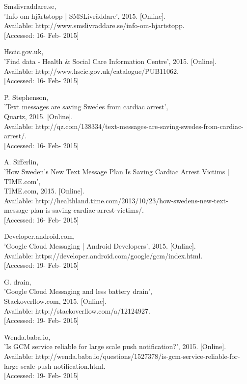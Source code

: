 \documentclass[]{article}
\begin{document}
\begin{enumerate}[label={[\arabic*]}]
\item Smslivraddare.se, \\'Info om hjärtstopp | SMSLivräddare', 2015. [Online].\\ Available: http://www.smslivraddare.se/info-om-hjartstopp. \\{} [Accessed: 16- Feb- 2015]

\item Hscic.gov.uk, \\'Find data - Health \& Social Care Information Centre', 2015. [Online].\\ Available: http://www.hscic.gov.uk/catalogue/PUB11062. \\{} [Accessed: 16- Feb- 2015]

\item P. Stephenson, \\'Text messages are saving Swedes from cardiac arrest', \\Quartz, 2015. [Online]. \\Available: http://qz.com/138334/text-messages-are-saving-swedes-from-cardiac-arrest/. \\{}[Accessed: 16- Feb- 2015]

\item A. Sifferlin,\\ 'How Sweden’s New Text Message Plan Is Saving Cardiac Arrest Victims | TIME.com', \\TIME.com, 2015. [Online].\\ Available: http://healthland.time.com/2013/10/23/how-swedens-new-text-message-plan-is-saving-cardiac-arrest-victims/. \\{}[Accessed: 16- Feb- 2015]

\item Developer.android.com, \\'Google Cloud Messaging | Android Developers', 2015. [Online].\\ Available: https://developer.android.com/google/gcm/index.html. \\{}[Accessed: 19- Feb- 2015]

\item G. drain, \\'Google Cloud Messaging and less battery drain',\\ Stackoverflow.com, 2015. [Online].\\ Available: http://stackoverflow.com/a/12124927. \\{}[Accessed: 19- Feb- 2015]

\item Wenda.baba.io, \\'Is GCM service reliable for large scale push notification?', 2015. [Online]. \\Available: http://wenda.baba.io/questions/1527378/is-gcm-service-reliable-for-large-scale-push-notification.html. \\{}[Accessed: 19- Feb- 2015]


\end{enumerate}
\end{document}
